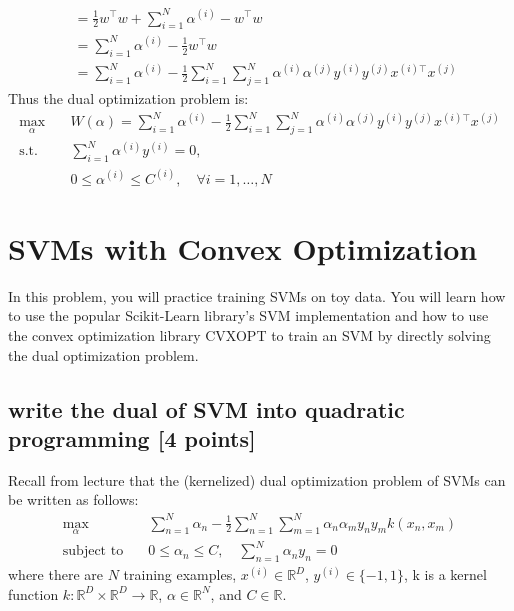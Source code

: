 \documentclass[lang=cn,11pt]{elegantbook}
\begin{document}
\begin{solution}
\begin{align}
    &= \frac{1}{2} w^\top w +\sum_{i=1}^{N} \alpha^{(i)} - w^\top w\\
    &= \sum_{i=1}^{N} \alpha^{(i)}  - \frac{1}{2} w^\top w \\
    & = \sum_{i=1}^{N} \alpha^{(i)} - \frac{1}{2} \sum_{i=1}^{N} \sum_{j=1}^{N} \alpha^{(i)} \alpha^{(j)} y^{(i)} y^{(j)} x^{(i)\top} x^{(j)}
\end{align}
Thus the dual optimization problem is:  \begin{align}
    \max_{\alpha} \quad & W(\alpha) = \sum_{i=1}^{N} \alpha^{(i)} - \frac{1}{2} \sum_{i=1}^{N} \sum_{j=1}^{N} \alpha^{(i)} \alpha^{(j)} y^{(i)} y^{(j)} x^{(i)\top} x^{(j)} \\
    \text{s.t.}\quad &\sum_{i=1}^{N} \alpha^{(i)} y^{(i)} = 0, \\
    & 0 \leq \alpha^{(i)} \leq C^{(i)}, \quad \forall i = 1, \dots, N
\end{align}
\end{solution}







\section{SVMs with Convex Optimization}

In this problem, you will practice training SVMs on toy data. You will learn how to use the popular 
Scikit-Learn library’s SVM implementation and how to use the convex optimization library CVXOPT to 
train an SVM by directly solving the dual optimization problem.

\subsection{write the dual of SVM into quadratic programming [4 points]}
Recall from lecture that the (kernelized) dual optimization problem of SVMs can be written as follows:
\begin{align}
\max_{\alpha} \quad & \sum_{n=1}^{N} \alpha_n - \frac{1}{2} \sum_{n=1}^{N} \sum_{m=1}^{N} \alpha_n \alpha_m y_n y_m k(x_n, x_m) \\
\text{subject to} \quad & 0 \leq \alpha_n \leq C, \quad \sum_{n=1}^{N} \alpha_n y_n = 0
\end{align}
where there are $N$ training examples, $x^{(i)} \in \mathbb{R}^D$, $y^{(i)} \in \{-1, 1\}$, 
k is a kernel function $k : \mathbb{R}^D \times \mathbb{R}^D \to \mathbb{R}$, 
$\alpha \in \mathbb{R}^N$, and $C \in \mathbb{R}$.
\end{document}
